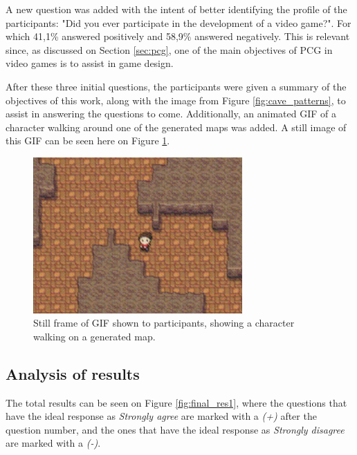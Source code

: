 A new question was added with the intent of better identifying the profile of the participants: "Did you ever participate in the development of a video game?". For which 41,1\% answered positively and 58,9\% answered negatively. This is relevant since, as discussed on Section \ref{sec:pcg}, one of the main objectives of PCG in video games is to assist in game design.

After these three initial questions, the participants were given a summary of the objectives of this work, along with the image from Figure \ref{fig:cave_patterns}, to assist in answering the questions to come. Additionally, an animated GIF of a character walking around one of the generated maps was added. A still image of this GIF can be seen here on Figure \ref{fig:gif}.

\begin{figure}[h]
    \caption{Still frame of GIF shown to participants, showing a character walking on a generated map.}
    \centerline{\includegraphics[width=8cm]{images/survey/gif.png}}
    \label{fig:gif}
\end{figure}

\subsection{Analysis of results}

The total results can be seen on Figure \ref{fig:final_res1}, where the questions that have the ideal response as \emph{Strongly agree} are marked with a \emph{(+)} after the question number, and the ones that have the ideal response as \emph{Strongly disagree} are marked with a \emph{(-)}.

